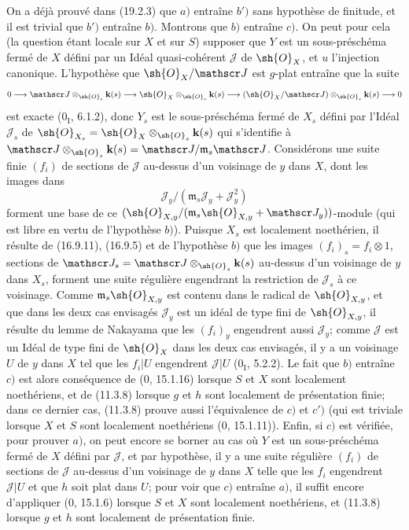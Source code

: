 On a déjà prouvé dans (19.2.3) que $a)$ entraîne $b')$ sans hypothèse de finitude, et il est trivial que $b')$ entraîne $b)$. Montrons que $b)$ entraîne $c)$. On peut pour cela (la question étant locale sur $X$ et sur $S$) supposer que $Y$ est un sous-préschéma fermé de $X$ défini par un Idéal quasi-cohérent $\mathscr J$ de $\sh{O}_X$, et $u$ l'injection canonique. L'hypothèse que $\sh{O}_X/\mathscr J$ est $g$-plat entraîne que la suite
\[
  0\longrightarrow\mathscr J\otimes_{\sh{O}_s}\mathbf k(s)\longrightarrow\sh{O}_X\otimes_{\sh{O}_s}\mathbf k(s)\longrightarrow(\sh{O}_X/\mathscr J)\otimes_{\sh{O}_s}\mathbf k(s)\longrightarrow0
\]
est exacte ($0_{\mathrm I}$, 6.1.2), donc $Y_s$ est le sous-préschéma fermé de $X_s$ défini par l'Idéal $\mathscr J_s$ de $\sh{O}_{X_s}=\sh{O}_X\otimes_{\sh{O}_s}\mathbf k(s)$ qui s'identifie à $\mathscr J\otimes_{\sh{O}_s}\mathbf k(s)=\mathscr J/\mathfrak m_s\mathscr J$. Considérons une suite finie $(f_i)$ de sections de $\mathscr J$ au-dessus d'un voisinage de $y$ dans $X$, dont les images dans
\[
  \mathscr J_y/(\mathfrak m_s\mathscr J_y+\mathscr J_y^2)
\]
forment une base de ce $(\sh{O}_{X,y}/(\mathfrak m_s\sh{O}_{X,y}+\mathscr J_y))$-module (qui est libre en vertu de l'hypothèse $b)$). Puisque $X_s$ est localement noethérien, il résulte de (16.9.11), (16.9.5) et de l'hypothèse $b)$ que les images $(f_i)_s=f_i\otimes1$, sections de $\mathscr J_s=\mathscr J\otimes_{\sh{O}_s}\mathbf k(s)$ au-dessus d'un voisinage de $y$ dans $X_s$, forment une suite régulière engendrant la restriction de $\mathscr J_s$ à ce voisinage. Comme $\mathfrak m_s\sh{O}_{X,y}$ est contenu dans le radical de $\sh{O}_{X,y}$, et que dans les deux cas envisagés $\mathscr J_y$ est un idéal de type fini de $\sh{O}_{X,y}$, il résulte du lemme de Nakayama que les $(f_i)_y$ engendrent aussi $\mathscr J_y$; comme $\mathscr J$ est un Idéal de type fini de $\sh{O}_X$ dans les deux cas envisagés, il y a un voisinage $U$ de $y$ dans $X$ tel que les $f_i|U$ engendrent $\mathscr J|U$ ($0_{\mathrm I}$, 5.2.2). Le fait que $b)$ entraîne $c)$ est alors conséquence de ($0$, 15.1.16) lorsque $S$ et $X$ sont localement noethériens, et de (11.3.8) lorsque $g$ et $h$ sont localement de présentation finie; dans ce dernier cas, (11.3.8) prouve aussi l'équivalence de $c)$ et $c')$ (qui est triviale lorsque $X$ et $S$ sont localement noethériens ($0$, 15.1.11)). Enfin, si $c)$ est vérifiée, pour prouver $a)$, on peut encore se borner au cas où $Y$ est un sous-préschéma fermé de $X$ défini par $\mathscr J$, et par hypothèse, il y a une suite régulière $(f_i)$ de sections de $\mathscr J$ au-dessus d'un voisinage de $y$ dans $X$ telle que les $f_i$ engendrent $\mathscr J|U$ et que $h$ soit plat dans $U$; pour voir que $c)$ entraîne $a)$, il suffit encore d'appliquer ($0$, 15.1.6) lorsque $S$ et $X$ sont localement noethériens, et (11.3.8) lorsque $g$ et $h$ sont localement de présentation finie.

